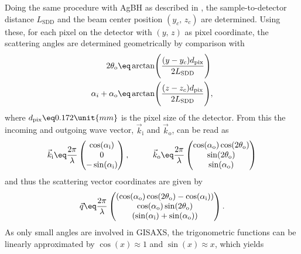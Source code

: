 \documentclass[\main/dresen_thesis.tex]{subfiles}
\begin{document}
    Doing the same procedure with AgBH as described in , the sample-to-detector distance $L_\mathrm{SDD}$ and the beam center position $(y_c,\,z_c)$ are determined.
    Using these, for each pixel on the detector with $(y,\,z)$ as pixel coordinate, the scattering angles are determined geometrically by comparison with 
    \begin{align}                                   
      \begin{split}
        2 \theta_\mathrm{o} &\eq \arctan \Biggl( \frac{(y - y_c) d_\mathrm{pix}}{2 L_\mathrm{SDD}} \Biggl)\\
        \alpha_i + \alpha_\mathrm{o} &\eq \arctan \Biggl( \frac{(z - z_c) d_\mathrm{pix}}{2 L_\mathrm{SDD}} \Biggl),
      \end{split}
    \end{align}
    where $d_\mathrm{pix} \eq 0.172 \unit{mm}$ is the pixel size of the detector.
    From this the incoming and outgoing wave vector, $\vec{k}_\mathrm{i}$ and $\vec{k}_\mathrm{o}$, can be read as
    \begin{align}
      \vec{k}_\mathrm{i} \eq \frac{2 \pi}{\lambda} \begin{pmatrix}
        \cos(\alpha_\mathrm{i})\\
        0\\
        -\sin(\alpha_\mathrm{i})
      \end{pmatrix}, \hspace{1cm}
      \vec{k}_\mathrm{o} \eq \frac{2 \pi}{\lambda} \begin{pmatrix}
        \cos(\alpha_\mathrm{o}) \cos(2\theta_\mathrm{o})\\
        \sin(2\theta_\mathrm{o})\\
        \sin(\alpha_\mathrm{o})
      \end{pmatrix}
    \end{align}
    and thus the scattering vector coordinates are given by
    \begin{align}
      \vec{q} \eq \frac{2 \pi}{\lambda} \begin{pmatrix}
        (\cos(\alpha_\mathrm{o}) \cos(2 \theta_\mathrm{o}) - \cos(\alpha_\mathrm{i}))\\
        \cos(\alpha_\mathrm{o}) \sin(2 \theta_\mathrm{o})\\
        (\sin(\alpha_\mathrm{i}) + \sin(\alpha_\mathrm{o}))
      \end{pmatrix}.
    \end{align}
    As only small angles are involved in GISAXS, the trigonometric functions can be linearly approximated by $\cos(x) \approx 1$ and $\sin(x) \approx x$, which yields
\end{document}
